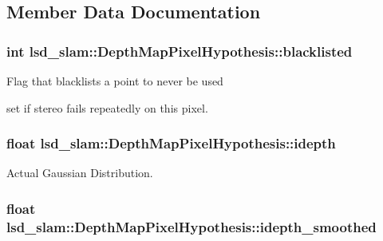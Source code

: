 \subsection{Member Data Documentation}
\hypertarget{classlsd__slam_1_1_depth_map_pixel_hypothesis_a27273a9266af3c4fb91147febeae020a}{
\subsubsection[{blacklisted}]{\setlength{\rightskip}{0pt plus 5cm}int lsd\-\_\-slam\-::\-Depth\-Map\-Pixel\-Hypothesis\-::blacklisted}}\label{classlsd__slam_1_1_depth_map_pixel_hypothesis_a27273a9266af3c4fb91147febeae020a}
Flag that blacklists a point to never be used
\begin{DoxyItemize}
\item set if stereo fails repeatedly on this pixel. 
\end{DoxyItemize}\hypertarget{classlsd__slam_1_1_depth_map_pixel_hypothesis_abfc19276c22e1c4fae82f61054a4579f}{
\subsubsection[{idepth}]{\setlength{\rightskip}{0pt plus 5cm}float lsd\-\_\-slam\-::\-Depth\-Map\-Pixel\-Hypothesis\-::idepth}}\label{classlsd__slam_1_1_depth_map_pixel_hypothesis_abfc19276c22e1c4fae82f61054a4579f}
Actual Gaussian Distribution. \hypertarget{classlsd__slam_1_1_depth_map_pixel_hypothesis_a82ac6c0b56d05a755373fdf23a9cacb2}{
\subsubsection[{idepth\-\_\-smoothed}]{\setlength{\rightskip}{0pt plus 5cm}float lsd\-\_\-slam\-::\-Depth\-Map\-Pixel\-Hypothesis\-::idepth\-\_\-smoothed}}\label{classlsd__slam_1_1_depth_map_pixel_hypothesis_a82ac6c0b56d05a755373fdf23a9cacb2}

